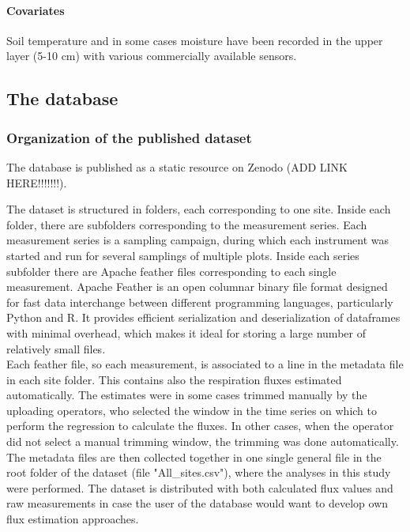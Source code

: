 \documentclass[12pt,a4paper]{article}
\begin{document}
\paragraph{Covariates}
Soil temperature and in some cases moisture have been recorded in the upper layer (5-10 cm) with various commercially available sensors.



\subsection{The database}

\subsubsection{Organization of the published dataset}
The database is published as a static resource on Zenodo (ADD LINK HERE!!!!!!!).

The dataset is structured in folders, each corresponding to one site. Inside each folder, there are subfolders corresponding to the measurement series. Each measurement series is a sampling campaign, during which each instrument was started and run for several samplings of multiple plots.
Inside each series subfolder there are Apache feather files corresponding to each single measurement. 
Apache Feather is an open columnar binary file format designed for fast data interchange between different programming languages, particularly Python and R. It provides efficient serialization and deserialization of dataframes with minimal overhead, 
which makes it ideal for storing a large number of relatively small files.\\

Each feather file, so each measurement, is associated to a line in the metadata file in each site folder. This contains also the respiration fluxes estimated automatically. The estimates were in some cases trimmed manually by the uploading operators, who selected the window in the time series on which to perform the regression to calculate the fluxes. In other cases, when the operator did not select a manual trimming window, the trimming was done automatically.
The metadata files are then collected together in one single general file in the root folder of the dataset (file "All\_sites.csv"), where the analyses in this study were performed.
The dataset is distributed with both calculated flux values and raw measurements in case the user of the database would want to develop own flux estimation approaches.
\end{document}
